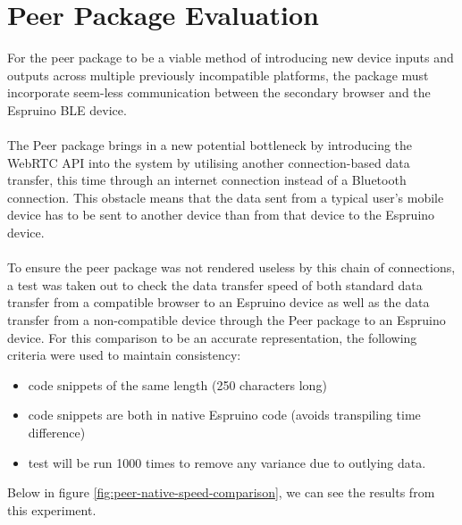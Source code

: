 \documentclass{l4proj}
\begin{document}
\section{Peer Package Evaluation}

For the peer package to be a viable method of introducing new device inputs and outputs across multiple previously incompatible platforms, the package must incorporate seem-less communication between the secondary browser and the Espruino BLE device.
\\ \\
The Peer package brings in a new potential bottleneck by introducing the WebRTC API into the system by utilising another connection-based data transfer, this time through an internet connection instead of a Bluetooth connection. This obstacle means that the data sent from a typical user's mobile device has to be sent to another device than from that device to the Espruino device.
\\ \\ 
To ensure the peer package was not rendered useless by this chain of connections, a test was taken out to check the data transfer speed of both standard data transfer from a compatible browser to an Espruino device as well as the data transfer from a non-compatible device through the Peer package to an Espruino device. For this comparison to be an accurate representation, the following criteria were used to maintain consistency:

\begin{itemize}
    \item code snippets of the same length (250 characters long)
    \item code snippets are both in native Espruino code (avoids transpiling time difference)
    \item test will be run 1000 times to remove any variance due to outlying data.
\end{itemize}

Below in figure \ref{fig:peer-native-speed-comparison}, we can see the results from this experiment.
\end{document}
